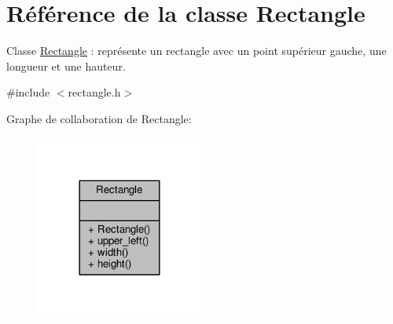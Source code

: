 \hypertarget{classRectangle}{\section{Référence de la classe Rectangle}
\label{classRectangle}
}


Classe \hyperlink{classRectangle}{Rectangle} \+: représente un rectangle avec un point supérieur gauche, une longueur et une hauteur.  




{\ttfamily \#include $<$rectangle.\+h$>$}



Graphe de collaboration de Rectangle\+:\nopagebreak
\begin{figure}[H]
\begin{center}
\leavevmode
\includegraphics[width=156pt]{db/dea/classRectangle__coll__graph}
\end{center}
\end{figure}
